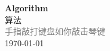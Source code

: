 \vspace*{\fill}
\begin{center}
    \textcolor{orange!50}{\Huge\textbf{Algorithm}} \\[1em]
    \textcolor{orange!60!pink}{\Large 算法} \\[2em]
    \textcolor{gray}{\large 手指敲打键盘如你敲击琴键} \\[1em]
    \today
\end{center}
\vspace*{\fill}
\clearpage


\clearpage

\clearpage




